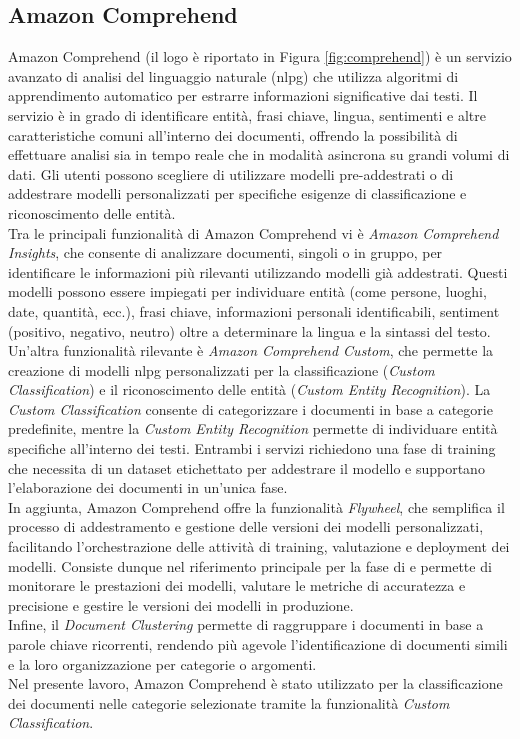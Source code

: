 \subsection{Amazon Comprehend}
Amazon Comprehend (il logo è riportato in Figura \ref{fig:comprehend}) è un servizio avanzato di analisi del linguaggio naturale (\gls{nlpg}) che utilizza algoritmi di apprendimento automatico per estrarre informazioni significative dai testi. Il servizio è in grado di identificare entità, frasi chiave, lingua, sentimenti e altre caratteristiche comuni all'interno dei documenti, offrendo la possibilità di effettuare analisi sia in tempo reale che in modalità asincrona su grandi volumi di dati. Gli utenti possono scegliere di utilizzare modelli pre-addestrati o di addestrare modelli personalizzati per specifiche esigenze di classificazione e riconoscimento delle entità.\\
Tra le principali funzionalità di Amazon Comprehend vi è \textit{Amazon Comprehend Insights}, che consente di analizzare documenti, singoli o in gruppo, per identificare le informazioni più rilevanti utilizzando modelli già addestrati. Questi modelli possono essere impiegati per individuare entità (come persone, luoghi, date, quantità, ecc.), frasi chiave, informazioni personali identificabili, 
sentiment (positivo, negativo, neutro) oltre a determinare la lingua e la sintassi del testo.\\
Un'altra funzionalità rilevante è \textit{Amazon Comprehend Custom}, che permette la creazione di modelli \gls{nlpg} personalizzati per la classificazione (\textit{Custom Classification}) e il riconoscimento delle entità (\textit{Custom Entity Recognition}). La \textit{Custom Classification} consente di categorizzare i documenti in base a categorie predefinite, mentre la \textit{Custom Entity Recognition} permette di individuare entità specifiche all'interno dei testi. Entrambi i servizi richiedono una fase di training che necessita di un dataset etichettato per addestrare il modello e supportano l'elaborazione dei documenti in un'unica fase.\\
In aggiunta, Amazon Comprehend offre la funzionalità \textit{Flywheel}, che semplifica il processo di addestramento e gestione delle versioni dei modelli personalizzati, facilitando l'orchestrazione delle attività di training, valutazione e deployment dei modelli. Consiste dunque nel riferimento principale per la fase di  e permette di monitorare le prestazioni dei modelli, valutare le metriche di accuratezza e precisione e gestire le versioni dei modelli in produzione.\\
Infine, il \textit{Document Clustering} permette di raggruppare i documenti in base a parole chiave ricorrenti, rendendo più agevole l'identificazione di documenti simili e la loro organizzazione per categorie o argomenti.\\
Nel presente lavoro, Amazon Comprehend è stato utilizzato per la classificazione dei documenti nelle categorie selezionate tramite la funzionalità \textit{Custom Classification}.

